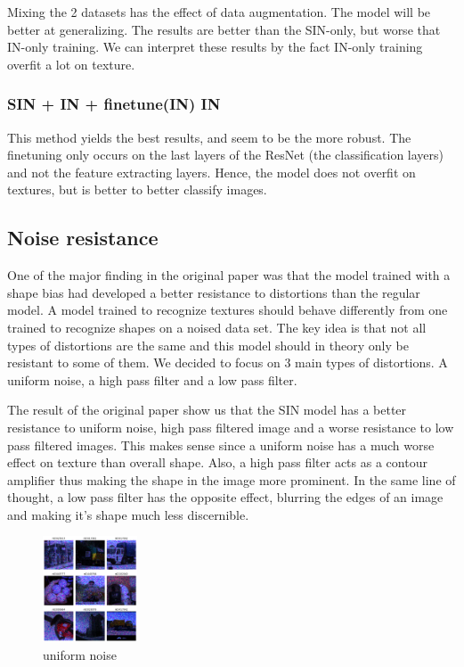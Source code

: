 \documentclass{article}
\begin{document}
Mixing the 2 datasets has the effect of data augmentation. The model will be better
at generalizing. The results are better than the SIN-only, but worse that IN-only training.
We can interpret these results by the fact IN-only training overfit a lot on texture.

\subsubsection{SIN + IN + finetune(IN) \texorpdfstring{\textrightarrow} .IN}

This method yields the best results, and seem to be the more robust. The finetuning only occurs
on the last layers of the ResNet (the classification layers) and not the feature extracting layers.
Hence, the model does not overfit on textures, but is better to better classify images.

\subsection{Noise resistance}


One of the major finding in the original paper was that the model trained with a shape bias had developed a better resistance to distortions than the regular model.
A model trained to recognize textures should behave differently from one trained to recognize shapes on a noised data set.  The key idea is that not all types of distortions are the same and this model should in theory only be resistant to some of them.  We decided to focus on 3 main types of distortions.  A uniform noise, a high pass filter and a low pass filter.

The result of the original paper show us that the SIN model has a better resistance to uniform noise, high pass filtered image and a worse resistance to low pass filtered images.
This makes sense since a uniform noise has a much worse effect on texture than overall shape. Also, a high pass filter acts as a contour amplifier thus making the shape in the image more prominent. In the same line of thought, a low pass filter has the opposite effect, blurring the edges of an image and making it's shape much less discernible.

\begin{figure}[h!]
\centering
\includegraphics[width = 0.25\textwidth]{imgs/image_uniform}
\caption{uniform noise}
\end{figure}
\end{document}
